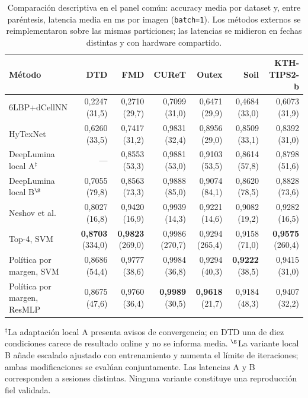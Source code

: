 \documentclass[a4paper,fleqn]{cas-sc}
\begin{document}
\begin{table}[pos=htbp]
\centering
\caption{Comparación descriptiva en el panel común: accuracy media por dataset y, entre paréntesis, latencia media en ms por imagen (\texttt{batch=1}). Los métodos externos se reimplementaron sobre las mismas particiones; las latencias se midieron en fechas distintas y con hardware compartido.}
\label{tab:sota}
\footnotesize
\setlength{\tabcolsep}{3.5pt}
\begin{tabular}{@{}lrrrrrr@{}}
\toprule
Método & DTD & FMD & CUReT & Outex & Soil & KTH-TIPS2-b \\
\midrule
6LBP+dCellNN \citep{chang2024cellnn} & 0,2247 (31,5) & 0,2710 (29,7) & 0,7099 (31,0) & 0,6471 (29,9) & 0,4684 (33,0) & 0,6073 (31,9) \\
HyTexNet \citep{gupta2026hytexnet} & 0,6260 (33,5) & 0,7417 (31,2) & 0,9831 (32,4) & 0,8956 (29,0) & 0,8509 (33,1) & 0,8392 (31,0) \\
DeepLumina local A$^{\ddagger}$ \citep{simon2022deeplumina} & --- & 0,8553 (53,3) & 0,9881 (53,0) & 0,9103 (53,5) & 0,8614 (57,8) & 0,8798 (51,6) \\
DeepLumina local B$^{\S}$ & 0,7055 (79,8) & 0,8563 (73,3) & 0,9888 (85,0) & 0,9074 (84,1) & 0,8620 (78,5) & 0,8828 (73,6) \\
Neshov et al. \citep{neshov2025aggregation} & 0,8027 (16,8) & 0,9420 (16,9) & 0,9939 (14,3) & 0,9221 (14,6) & 0,9082 (19,2) & 0,9282 (16,5) \\
\midrule
Top-4, SVM & \textbf{0,8703} (334,0) & \textbf{0,9823} (269,0) & 0,9986 (270,7) & 0,9294 (265,4) & 0,9158 (71,0) & \textbf{0,9575} (260,4) \\
Política por margen, SVM & 0,8686 (54,4) & 0,9777 (38,6) & 0,9984 (36,8) & 0,9294 (40,3) & \textbf{0,9222} (38,5) & 0,9415 (31,0) \\
Política por margen, ResMLP & 0,8675 (47,6) & 0,9760 (36,4) & \textbf{0,9989} (30,5) & \textbf{0,9618} (21,7) & 0,9184 (48,3) & 0,9407 (32,2) \\
\bottomrule
\end{tabular}

\vspace{0.35em}
\begin{minipage}{0.98\textwidth}\footnotesize
$^{\ddagger}$La adaptación local A presenta avisos de convergencia; en DTD una de diez condiciones carece de resultado online y no se informa media. $^{\S}$La variante local B añade escalado ajustado con entrenamiento y aumenta el límite de iteraciones; ambas modificaciones se evalúan conjuntamente. Las latencias A y B corresponden a sesiones distintas. Ninguna variante constituye una reproducción fiel validada.
\end{minipage}
\end{table}
\end{document}
